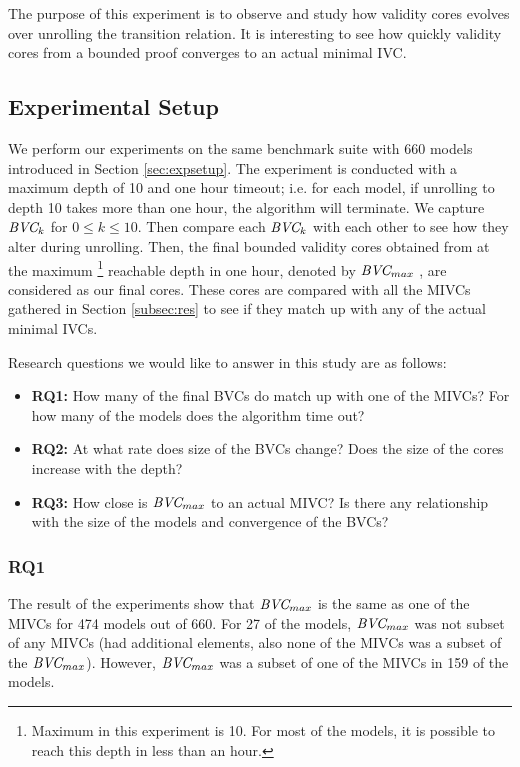 The purpose of this experiment is to observe and study how validity cores evolves over unrolling the transition relation. It is interesting to see how quickly validity cores from a bounded proof converges to an actual minimal IVC.

\subsection{Experimental Setup}
  We perform our experiments on the same benchmark suite with 660 models introduced in Section \ref{sec:expsetup}. The experiment is conducted with a maximum depth of 10 and one hour timeout; i.e. for each model, if unrolling to depth 10 takes more than one hour, the \bvcalg algorithm will terminate. We capture $\textit{BVC} _{k}$ for $ 0 \leq k \le 10$. Then compare each $\textit{BVC} _{k}$ with each other to see how they alter during unrolling. Then, the final bounded validity cores obtained from at the maximum
  \footnote{Maximum in this experiment is 10. For most of the models, it is possible to reach this depth in less than an hour.}
  reachable depth in one hour, denoted by $\textit{BVC} _{max}$ , are considered as our final cores. These cores are compared with all the MIVCs gathered in Section \ref{subsec:res} to see if they match up with any of the actual minimal IVCs.

Research questions we would like to answer in this study are as follows:
\begin{itemize}
  \item \textbf{RQ1:} How many of the final BVCs do match up with one of the MIVCs? For how many of the models does the algorithm time out?
  \item \textbf{RQ2:} At what rate does size of the BVCs change? Does the size of the cores increase with the depth? 
  \item \textbf{RQ3:} How close is $\textit{BVC} _{max}$ to an actual MIVC? Is there any relationship with the size of the models and convergence of the BVCs?
\end{itemize}

\vspace{0.1in}
\subsubsection{RQ1}
The result of the experiments show that $\textit{BVC} _{max}$ is the same as one of the MIVCs for 474 models out of 660. For 27 of the models, $\textit{BVC} _{max}$ was not subset of any MIVCs (had additional elements, also none of the MIVCs was a subset of the $\textit{BVC} _{max}$). However, $\textit{BVC} _{max}$ was a subset of one of the MIVCs in 159 of the models.

